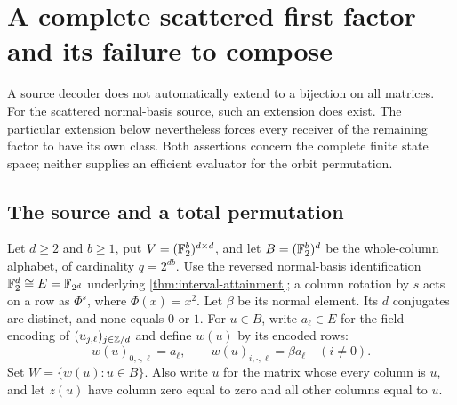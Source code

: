 \section{A complete scattered first factor and its failure to compose}
\label{sec:completion}

A source decoder does not automatically extend to a bijection on all
matrices.  For the scattered normal-basis source, such an extension does
exist.  The particular extension below nevertheless forces every receiver
of the remaining factor to have its own class.  Both assertions concern
the complete finite state space; neither supplies an efficient evaluator
for the orbit permutation.

\subsection{The source and a total permutation}

Let $d\ge2$ and $b\ge1$, put
$V=(\mathbb{F}_2^b)^{d\times d}$, and let
$B=(\mathbb{F}_2^b)^d$ be the whole-column alphabet, of cardinality
$q=2^{db}$.  Use the reversed normal-basis identification
$\mathbb{F}_2^d\cong E=\mathbb{F}_{2^d}$ underlying
\cref{thm:interval-attainment}; a column rotation by $s$ acts on a row
as $\Phi^s$, where $\Phi(x)=x^2$.
Let $\beta$ be its normal element.  Its $d$ conjugates are distinct,
and none equals $0$ or $1$.
For $u\in B$, write $a_\ell\in E$ for the field encoding of
$(u_{j,\ell})_{j\in\mathbb{Z}/d}$ and define $w(u)$ by its encoded rows:
\[
 w(u)_{0,\cdot,\ell}=a_\ell,\qquad
 w(u)_{i,\cdot,\ell}=\beta a_\ell\quad(i\ne0).
\]
Set $W=\{w(u):u\in B\}$.  Also write $\bar u$ for the matrix whose
every column is $u$, and let $z(u)$ have column zero equal to zero and
all other columns equal to $u$.

